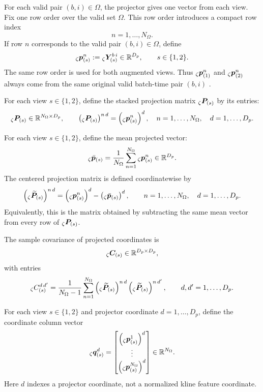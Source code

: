 For each valid pair $(b,i)\in\Omega$, the projector gives one vector from each
view.  Fix one row order over the valid set $\Omega$.  This row order introduces
a compact row index
\[
  n=1,\ldots,N_{\Omega}.
\]
If row $n$ corresponds to the valid pair $(b,i)\in\Omega$, define
\[
  {}_{\zeta}\bm{p}_{(s)}^{n}
  :=
  {}_{\zeta}\bm{Y}_{(s)}^{b\,i}
  \in
  \mathbb{R}^{D_p},
  \qquad
  s\in\{1,2\}.
\]
The same row order is used for both augmented views.  Thus
${}_{\zeta}\bm{p}_{(1)}^{n}$ and
${}_{\zeta}\bm{p}_{(2)}^{n}$ always come from the same original valid
batch-time pair $(b,i)$%
.

For each view $s\in\{1,2\}$, define the stacked projection matrix
${}_{\zeta}\bm{P}_{(s)}$ by its entries:
\[
  {}_{\zeta}\bm{P}_{(s)}
  \in
  \mathbb{R}^{N_{\Omega}\times D_p},
  \qquad
  \left(
    {}_{\zeta}\bm{P}_{(s)}
  \right)^{n\,d}
  =
  \left(
    {}_{\zeta}\bm{p}_{(s)}^{n}
  \right)^{d},
  \quad
  n=1,\ldots,N_{\Omega},
  \quad
  d=1,\ldots,D_p.
\]

For each view $s\in\{1,2\}$, define the mean projected vector:
\[
  {}_{\zeta}\bar{\bm{p}}_{(s)}
  =
  \frac{1}{N_{\Omega}}
  \sum_{n=1}^{N_{\Omega}}
  {}_{\zeta}\bm{p}_{(s)}^{n}
  \in
  \mathbb{R}^{D_p}.
\]
The centered projection matrix is defined coordinatewise by
\[
  \left(
    {}_{\zeta}\widetilde{\bm{P}}_{(s)}
  \right)^{n\,d}
  =
  \left(
    {}_{\zeta}\bm{p}_{(s)}^{n}
  \right)^{d}
  -
  \left(
    {}_{\zeta}\bar{\bm{p}}_{(s)}
  \right)^{d},
  \qquad
  n=1,\ldots,N_{\Omega},
  \quad
  d=1,\ldots,D_p.
\]
Equivalently, this is the matrix obtained by subtracting the same mean vector
from every row of ${}_{\zeta}\bm{P}_{(s)}$.

The sample covariance of projected coordinates is
\[
  {}_{\zeta}\bm{C}_{(s)}
  \in
  \mathbb{R}^{D_p\times D_p},
\]
with entries
\[
  {}_{\zeta}C_{(s)}^{d\,d'}
  =
  \frac{1}{N_{\Omega}-1}
  \sum_{n=1}^{N_{\Omega}}
  \left(
    {}_{\zeta}\widetilde{\bm{P}}_{(s)}
  \right)^{n\,d}
  \left(
    {}_{\zeta}\widetilde{\bm{P}}_{(s)}
  \right)^{n\,d'},
  \qquad
  d,d'=1,\ldots,D_p.
\]

For each view $s\in\{1,2\}$ and projector coordinate
$d=1,\ldots,D_p$, define the coordinate column vector
\[
  {}_{\zeta}\bm{q}_{(s)}^{d}
  =
  \begin{bmatrix}
    \left({}_{\zeta}\bm{p}_{(s)}^{1}\right)^{d}\\
    \vdots\\
    \left({}_{\zeta}\bm{p}_{(s)}^{N_{\Omega}}\right)^{d}
  \end{bmatrix}
  \in
  \mathbb{R}^{N_{\Omega}}.
\]
Here $d$ indexes a projector coordinate, not a normalized kline feature
coordinate.

